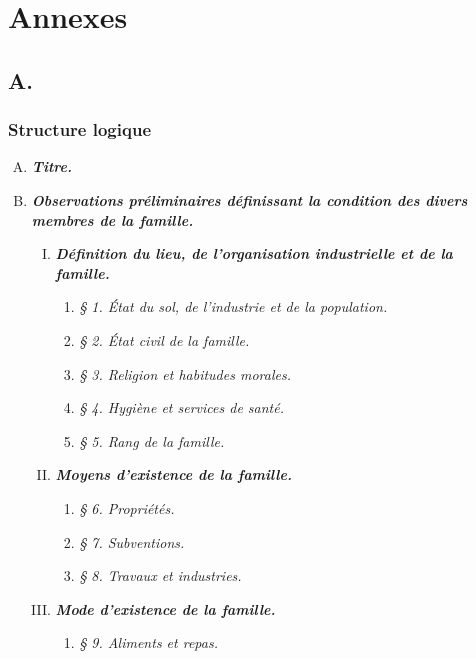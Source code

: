 \part*{Annexes}
\appendix
\renewcommand{\thechapter}{A}
\chapter{A. \lodm}

\section{Structure logique}
\label{structure}

\begin{enumerate}[A.]
    \item \textbf{\textit{Titre.}}
    \item \textbf{\textit{Observations préliminaires définissant la condition des divers membres de la famille.}}
    \begin{enumerate}[I.]
        \item \textbf{\textit{Définition du lieu, de l'organisation industrielle et de la famille.}}
        \begin{enumerate}[]
            \item \textit{§ 1. État du sol, de l'industrie et de la population.}
            \item \textit{§ 2. État civil de la famille.}
            \item \textit{§ 3. Religion et habitudes morales.}
            \item \textit{§ 4. Hygiène et services de santé.}
            \item \textit{§ 5. Rang de la famille.}
        \end{enumerate}
        \item \textbf{\textit{Moyens d'existence de la famille.}}
        \begin{enumerate}[]
            \item \textit{§ 6. Propriétés.}
            \item \textit{§ 7. Subventions.}
            \item \textit{§ 8. Travaux et industries.}
        \end{enumerate}
        \item \textbf{\textit{Mode d'existence de la famille.}}
        \begin{enumerate}[]
            \item \textit{§ 9. Aliments et repas.}

\end{enumerate}
\end{enumerate}
\end{enumerate}

